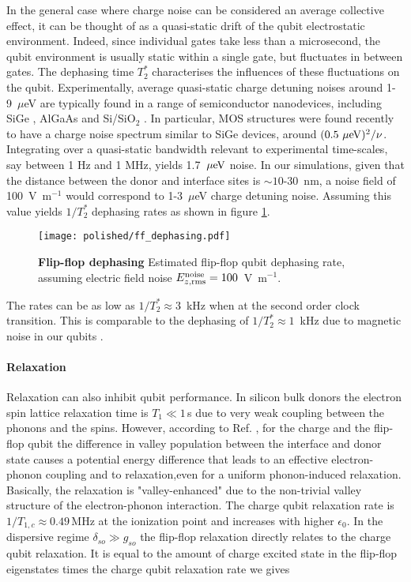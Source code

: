In the general case where charge noise can be considered an average collective effect, it can be thought of as a quasi-static drift of the qubit electrostatic environment. Indeed, since individual gates take less than a microsecond, the qubit environment is usually static within a single gate, but fluctuates in between gates. The dephasing time $T_2^*$ characterises the influences of these fluctuations on the qubit. Experimentally, average quasi-static charge detuning noises around 1-9~$\mu$eV are typically found in a range of semiconductor nanodevices, including SiGe \cite{Kim2015S,Thorgrimsson2016S,Freeman2016S}, AlGaAs \cite{Dial2013S} and Si/SiO$_2$ \cite{Harvey-Collard2015S,Freeman2016S}. In particular, MOS structures were found recently \cite{Freeman2016S} to have a charge noise spectrum similar to SiGe devices, around $(0.5~{\rm \mu eV})^2/\nu$. Integrating over a quasi-static bandwidth relevant to experimental time-scales, say between 1 Hz  and 1 MHz, yields 1.7~${\rm \mu eV}$ noise. In our simulations, given that the distance between the donor and interface sites is $\sim10$-30~nm, a noise field of 100~V~m$^{-1}$ would correspond to 1-3~$\mu$eV charge detuning noise. 
Assuming this value yields $1/T_2^*$ dephasing rates as shown in figure \ref{fig:ff_dephasing}. 

\begin{figure}[h]
	\centering
	\texttt{[image: polished/ff\_dephasing.pdf]}
	\caption[Flip-flop dephasing]{\textbf{Flip-flop dephasing} Estimated flip-flop qubit dephasing rate, assuming electric field noise $E_{z, \rm rms}^{\rm noise}=100$~V~m$^{-1}$.}
	\label{fig:ff_dephasing}
\end{figure}

The rates can be as low as $1/T_2^{\ast} \approx 3$~kHz when at the second order clock transition. This is comparable to the dephasing of $1/T_2^{\ast} \approx 1$~kHz due to magnetic noise in our qubits \cite{Muhonen2014}. 

\paragraph{Relaxation}

Relaxation can also inhibit qubit performance. In silicon bulk donors the electron spin lattice relaxation time is $T_1\ll 1\,$s due to very weak coupling between the phonons and the spins. However, according to Ref. \cite{Boross2016},  for the charge and the flip-flop qubit the difference in valley population between the interface and donor state causes a potential energy difference that leads to an effective electron-phonon coupling and to relaxation,even for a uniform phonon-induced relaxation. Basically, the relaxation is "valley-enhanced" due to the non-trivial valley structure of the electron-phonon interaction. The charge qubit relaxation rate is $1/T_{1,c}\approx 0.49\,$MHz at the ionization point and increases with higher $\epsilon_0$. 
In the dispersive regime $\delta_{so}\gg g_{so}$ the flip-flop relaxation directly relates to the charge qubit relaxation. It is equal to the amount of charge excited state in the flip-flop eigenstates times the charge qubit relaxation rate we gives

